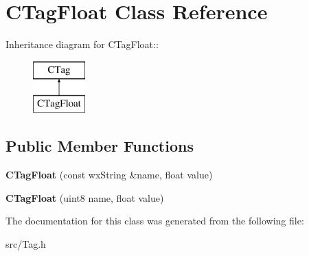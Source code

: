 \section{CTagFloat Class Reference}
\label{classCTagFloat}
Inheritance diagram for CTagFloat::\begin{figure}[H]
\begin{center}
\leavevmode
\includegraphics[height=2cm]{classCTagFloat}
\end{center}
\end{figure}
\subsection*{Public Member Functions}
\begin{DoxyCompactItemize}
\item 
{\bfseries CTagFloat} (const wxString \&name, float value)\label{classCTagFloat_a6556b7cf3c4ba5961458441d1ab6e51e}

\item 
{\bfseries CTagFloat} (uint8 name, float value)\label{classCTagFloat_a20085e25c74055c335bba35c6ce7a15c}

\end{DoxyCompactItemize}


The documentation for this class was generated from the following file:\begin{DoxyCompactItemize}
\item 
src/Tag.h\end{DoxyCompactItemize}
